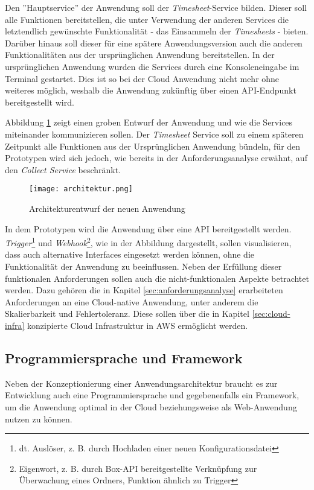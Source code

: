 Den ''Hauptservice'' der Anwendung soll der \textit{\gls{Timesheet}}-Service bilden. Dieser soll alle Funktionen bereitstellen, die unter Verwendung der anderen Services die letztendlich gewünschte Funktionalität - das Einsammeln der \textit{\glspl{Timesheet}} - bieten. Darüber hinaus soll dieser für eine spätere Anwendungsversion auch die anderen Funktionalitäten aus der ursprünglichen Anwendung bereitstellen. In der ursprünglichen Anwendung wurden die Services durch eine Konsoleneingabe im Terminal gestartet. Dies ist so bei der Cloud Anwendung nicht mehr ohne weiteres möglich, weshalb die Anwendung zukünftig über einen \ac{API}-Endpunkt bereitgestellt wird. \pagebreak

Abbildung \ref{fig:Architektur} zeigt einen groben  Entwurf der Anwendung und wie die Services miteinander kommunizieren sollen. Der \textit{\gls{Timesheet}} Service soll zu einem späteren Zeitpunkt alle Funktionen aus der Ursprünglichen Anwendung bündeln, für den Prototypen wird sich jedoch, wie bereits in der Anforderungsanalyse erwähnt, auf den \textit{Collect Service} beschränkt.

\begin{figure}[H]
    \centering
    \texttt{[image: architektur.png]}
    \caption{Architekturentwurf der neuen Anwendung}
    \label{fig:Architektur}
\end{figure}

In dem Prototypen wird die Anwendung über eine \ac{API} bereitgestellt werden. \textit{Trigger}\footnote{dt. Auslöser, z. B. durch Hochladen einer neuen Konfigurationsdatei} und \textit{Webhook}\footnote{Eigenwort, z. B. durch \gls{Box}-API bereitgestellte Verknüpfung zur Überwachung eines Ordners, Funktion ähnlich zu Trigger}, wie in der Abbildung dargestellt, sollen visualisieren, dass auch alternative Interfaces eingesetzt werden können, ohne die Funktionalität der Anwendung zu beeinflussen. Neben der Erfüllung dieser funktionalen Anforderungen sollen auch die nicht-funktionalen Aspekte betrachtet werden. Dazu gehören die in Kapitel \ref{sec:anforderungsanalyse} erarbeiteten Anforderungen an eine Cloud-native Anwendung, unter anderem die Skalierbarkeit und Fehlertoleranz. Diese sollen über die in Kapitel \ref{sec:cloud-infra} konzipierte Cloud Infrastruktur in \ac{AWS} ermöglicht werden. \pagebreak

\subsection{Programmiersprache und Framework}
Neben der Konzeptionierung einer Anwendungsarchitektur braucht es zur Entwicklung auch eine Programmiersprache und gegebenenfalls ein Framework, um die Anwendung optimal in der Cloud beziehungsweise als Web-Anwendung nutzen zu können. 

